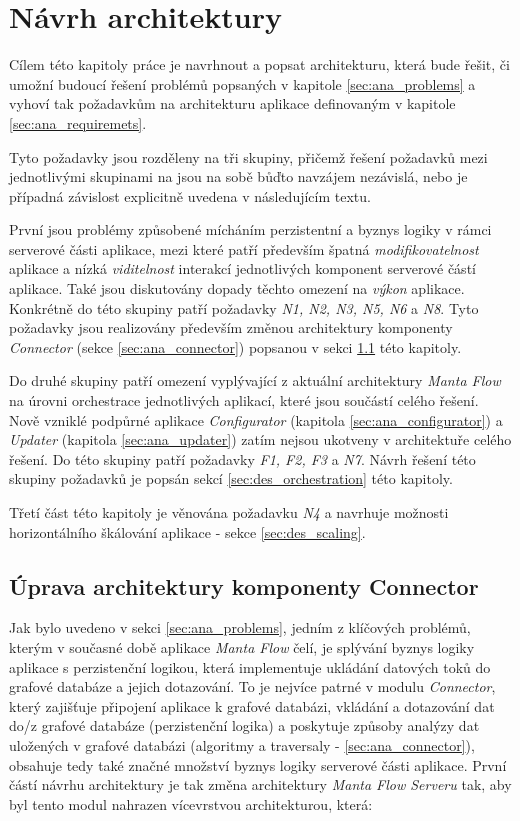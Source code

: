 \chapter{Návrh architektury}
Cílem této kapitoly práce je navrhnout a popsat architekturu, která bude řešit, či umožní budoucí řešení problémů popsaných v kapitole \ref{sec:ana_problems} a vyhoví tak požadavkům na architekturu aplikace definovaným v kapitole \ref{sec:ana_requiremets}.

Tyto požadavky jsou rozděleny na tři skupiny, přičemž řešení požadavků mezi jednotlivými skupinami na jsou na sobě bůďto navzájem nezávislá, nebo je případná závislost explicitně uvedena v následujícím textu.

První jsou problémy způsobené mícháním perzistentní a byznys logiky v rámci serverové části aplikace, mezi které patří především špatná \textit{modifikovatelnost} aplikace a nízká \textit{viditelnost} interakcí jednotlivých komponent serverové částí aplikace. Také jsou diskutovány dopady těchto omezení na \textit{výkon} aplikace. Konkrétně do této skupiny patří požadavky \textit{N1, N2, N3, N5, N6} a \textit{N8}. Tyto požadavky jsou realizovány především změnou architektury komponenty \textit{Connector} (sekce \ref{sec:ana_connector}) popsanou v sekci \ref{sec:des_api} této kapitoly.

Do druhé skupiny patří omezení vyplývající z aktuální architektury \textit{Manta Flow} na úrovni orchestrace jednotlivých aplikací, které jsou součástí celého řešení. Nově vzniklé podpůrné aplikace \textit{Configurator} (kapitola \ref{sec:ana_configurator}) a \textit{Updater} (kapitola \ref{sec:ana_updater}) zatím nejsou ukotveny v architektuře celého řešení.
Do této skupiny patří požadavky \textit{F1, F2, F3} a \textit{N7}. Návrh řešení této skupiny požadavků je popsán sekcí \ref{sec:des_orchestration} této kapitoly.

Třetí část této kapitoly je věnována požadavku \textit{N4} a navrhuje možnosti horizontálního škálování aplikace - sekce \ref{sec:des_scaling}.

\section{Úprava architektury komponenty Connector}
\label{sec:des_api}
Jak bylo uvedeno v sekci \ref{sec:ana_problems}, jedním z klíčových problémů, kterým v současné době aplikace \textit{Manta Flow} čelí, je splývání byznys logiky aplikace s perzistenční logikou, která implementuje ukládání datových toků do grafové databáze a jejich dotazování. To je nejvíce patrné v modulu \textit{Connector}, který zajišťuje připojení aplikace k grafové databázi, vkládání a dotazování dat do/z grafové databáze (perzistenční logika) a poskytuje způsoby analýzy dat uložených v grafové databázi (algoritmy a traversaly - \ref{sec:ana_connector}), obsahuje tedy také značné množství byznys logiky serverové části aplikace. První částí návrhu architektury je tak změna architektury \textit{Manta Flow Serveru} tak, aby byl tento modul nahrazen vícevrstvou architekturou, která:

